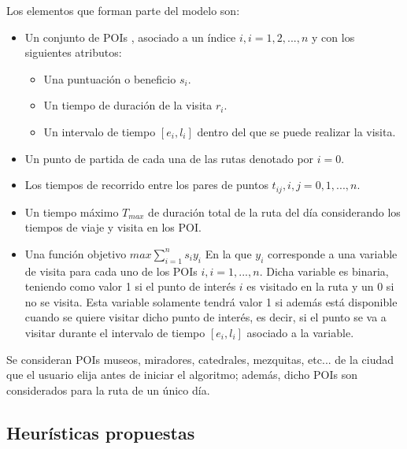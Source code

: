 Los elementos que forman parte del modelo son:
\begin{itemize}
	\item Un conjunto de POIs , asociado a un índice $i, i=1,2,...,n$ y con los siguientes atributos:
	\begin{itemize}
		\item Una puntuación o beneficio $s_i$.
		\item Un tiempo de duración de la visita $r_i$.
		\item Un intervalo de tiempo $[e_i,l_i]$ dentro del que se puede realizar la visita.
	\end{itemize}
	\item Un punto de partida de cada una de las rutas denotado por $i=0$.
	\item Los tiempos de recorrido entre los pares de puntos $t_{ij}, i,j=0,1,...,n$.
	\item Un tiempo máximo $T_{max}$ de duración total de la ruta del día considerando los tiempos de viaje y visita en los POI.
	\item Una función objetivo $max \sum_{i=1}^{n}s_iy_i$ \newline
	En la que $y_i$ corresponde a una variable de visita para cada uno de los POIs $i, i=1,...,n$. Dicha variable es binaria, teniendo como valor 1 si el punto de interés $i$ es visitado en la ruta y un 0 si no se visita. Esta variable solamente tendrá valor 1 si además está disponible cuando se quiere visitar dicho punto de interés, es decir, si el punto se va a visitar durante el intervalo de tiempo $[e_i,l_i]$ asociado a la variable.
\end{itemize}
Se consideran POIs museos, miradores, catedrales, mezquitas, etc... de la ciudad que el usuario elija antes de iniciar el algoritmo; además, dicho POIs son considerados para la ruta de un único día.
\subsection[Heurísticas propuestas]{Heurísticas propuestas}
